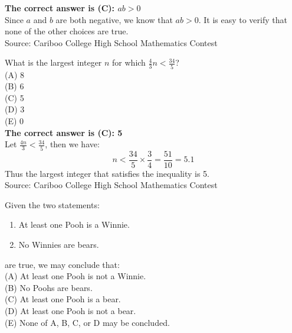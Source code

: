 \documentclass{article}
\begin{document}
\textbf{The correct answer is (C): $ab>0$}\\[1 ex]
Since $a$ and $b$ are both negative, we know that $ab>0$. It is easy to verify that none of the other choices are true.
\\[5 ex]

\scriptsize
Source: Cariboo College High School Mathematics Contest

\normalsize
What is the largest integer $n$ for which $\frac{4}{3}n<\frac{34}{5}$?\\
(A) 8\\
(B) 6\\
(C) 5\\
(D) 3\\
(E) 0\\


\textbf{The correct answer is (C): 5}\\[1 ex]
Let $\frac{4n}{3}<\frac{34}{5}$, then we have:\\
\begin{equation*}
n<\frac{34}{5}\times\frac{3}{4}=\frac{51}{10}=5.1
\end{equation*}
Thus the largest integer that satisfies the inequality is 5.
\\[5 ex]

\scriptsize
Source: Cariboo College High School Mathematics Contest

\normalsize
Given the two statements:
\begin{enumerate}
\item{At least one Pooh is a Winnie.}
\item{No Winnies are bears.}
\end{enumerate} 
are true, we may conclude that:\\
(A) At least one Pooh is not a Winnie.\\
(B) No Poohs are bears.\\
(C) At least one Pooh is a bear.\\
(D) At least one Pooh is not a bear.\\
(E) None of A, B, C, or D may be concluded.\\
\end{document}
